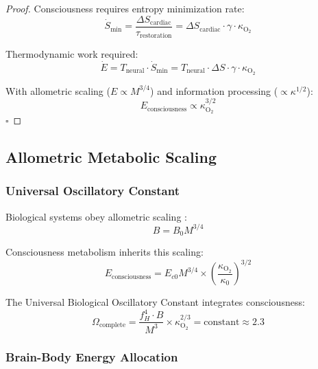 \documentclass[12pt]{article}
\theoremstyle{remark}
\begin{document}
\begin{proof}
Consciousness requires entropy minimization rate:
\begin{equation}
\dot{S}_{\text{min}} = \frac{\Delta S_{\text{cardiac}}}{\tau_{\text{restoration}}} = \Delta S_{\text{cardiac}} \cdot \gamma \cdot \kappa_{\text{O}_2}
\end{equation}

Thermodynamic work required:
\begin{equation}
\dot{E} = T_{\text{neural}} \cdot \dot{S}_{\text{min}} = T_{\text{neural}} \cdot \Delta S \cdot \gamma \cdot \kappa_{\text{O}_2}
\end{equation}

With allometric scaling ($E \propto M^{3/4}$) and information processing ($ \propto \kappa^{1/2}$):
\begin{equation}
E_{\text{consciousness}} \propto \kappa_{\text{O}_2}^{3/2}
\end{equation}
$\square$
\end{proof}

\subsection{Allometric Metabolic Scaling}

\subsubsection{Universal Oscillatory Constant}

Biological systems obey allometric scaling \citep{west1997general,brown2004toward}:
\begin{equation}
B = B_0 M^{3/4}
\end{equation}

Consciousness metabolism inherits this scaling:
\begin{equation}
E_{\text{consciousness}} = E_{c0} M^{3/4} \times \left(\frac{\kappa_{\text{O}_2}}{\kappa_0}\right)^{3/2}
\end{equation}

The Universal Biological Oscillatory Constant integrates consciousness:
\begin{equation}
\Omega_{\text{complete}} = \frac{f_H^4 \cdot B}{M^3} \times \kappa_{\text{O}_2}^{2/3} = \text{constant} \approx 2.3
\end{equation}

\subsubsection{Brain-Body Energy Allocation}
\end{document}

